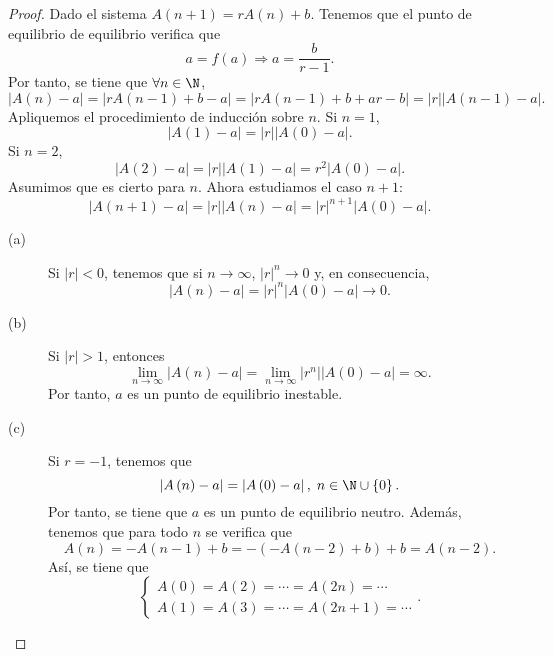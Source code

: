 \begin{proof}  Dado el sistema $\displaystyle A\left(n+1\right) = rA\left(n\right)+b $. Tenemos que el punto de equilibrio de equilibrio verifica que 
	\[a = f\left(a\right) \Rightarrow a = \frac{b}{r-1} .\]
	Por tanto, se tiene que $\displaystyle \forall n \in \N $, 
	\[ \left|A\left(n\right)-a\right| = \left|rA\left(n-1\right)+b-a\right| = \left|rA\left(n-1\right)+b+ar-b\right| = \left|r\right| \left|A\left(n-1\right)-a\right| .\]
	Apliquemos el procedimiento de inducción sobre $\displaystyle n $. Si $\displaystyle n = 1 $, 
	\[ \left|A\left(1\right) - a\right| = \left|r\right| \left|A\left(0\right)-a\right| .\]
	Si $\displaystyle n = 2 $, 
	\[ \left|A\left(2\right)-a\right| = \left|r\right| \left|A\left(1\right)-a\right| = r^{2} \left|A\left(0\right)-a\right| .\]
	Asumimos que es cierto para $\displaystyle n $. Ahora estudiamos el caso $\displaystyle n+1 $:
	\[ \left|A\left(n+1\right)-a\right| = \left|r\right| \left|A\left(n\right)-a\right| = \left|r\right|^{n+1} \left|A\left(0\right)-a\right| .\]
\begin{description}
	\item[(a)] Si $\displaystyle \left|r\right| < 0 $, tenemos que si $\displaystyle n \to \infty $, $\displaystyle \left|r\right|^{n} \to 0 $ y, en consecuencia, 
	\[ \left|A\left(n\right)-a\right| = \left|r\right|^{n} \left|A\left(0\right)-a\right| \to 0 .\]
\item[(b)] Si $\displaystyle \left|r\right| > 1 $, entonces
	\[\lim_{n \to \infty} \left|A\left(n\right)-a\right| = \lim_{n \to \infty} \left|r^{n}\right| \left|A\left(0\right)-a\right| = \infty .\]
	Por tanto, $\displaystyle a $ es un punto de equilibrio inestable.
\item[(c)] Si $\displaystyle r = - 1 $, tenemos que 
	\[ \left|A\left(n\right)-a\right| = \left|A\left(0\right)-a\right|, \; n \in \N\cup \left\{ 0\right\}  .\]
	Por tanto, se tiene que $\displaystyle a $ es un punto de equilibrio neutro. Además, tenemos que para todo $\displaystyle n $ se verifica que 
	\[A\left(n\right) = - A\left(n-1\right) + b = - \left(-A\left(n-2\right)+b\right)+b = A\left(n-2\right) .\]
	Así, se tiene que
	\[
	\begin{cases}
	A\left(0\right) = A\left(2\right) = \cdots = A\left(2n\right) = \cdots \\
	A\left(1\right) = A\left(3\right) = \cdots = A\left(2n+1\right) = \cdots 
	\end{cases}
	.\]
\end{description}
\end{proof}


